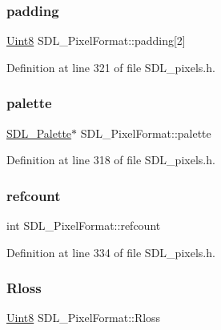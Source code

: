 \subsubsection{\texorpdfstring{padding}{padding}}
{\footnotesize\ttfamily \mbox{\hyperlink{_s_d_l__stdinc_8h_a2944638813a090aa23e62f4da842c3e2}{Uint8}} S\+D\+L\+\_\+\+Pixel\+Format\+::padding\mbox{[}2\mbox{]}}



Definition at line 321 of file S\+D\+L\+\_\+pixels.\+h.

\mbox{\label{struct_s_d_l___pixel_format_aeae611aba76f5eb11b696807926c5116}} 
\subsubsection{\texorpdfstring{palette}{palette}}
{\footnotesize\ttfamily \mbox{\hyperlink{struct_s_d_l___palette}{S\+D\+L\+\_\+\+Palette}}$\ast$ S\+D\+L\+\_\+\+Pixel\+Format\+::palette}



Definition at line 318 of file S\+D\+L\+\_\+pixels.\+h.

\mbox{\label{struct_s_d_l___pixel_format_a23be8060443d58064a720a4e2ef31729}} 
\subsubsection{\texorpdfstring{refcount}{refcount}}
{\footnotesize\ttfamily int S\+D\+L\+\_\+\+Pixel\+Format\+::refcount}



Definition at line 334 of file S\+D\+L\+\_\+pixels.\+h.

\mbox{\label{struct_s_d_l___pixel_format_a9994b4ed87a2551253aebfa191db8424}} 
\subsubsection{\texorpdfstring{Rloss}{Rloss}}
{\footnotesize\ttfamily \mbox{\hyperlink{_s_d_l__stdinc_8h_a2944638813a090aa23e62f4da842c3e2}{Uint8}} S\+D\+L\+\_\+\+Pixel\+Format\+::\+Rloss}




